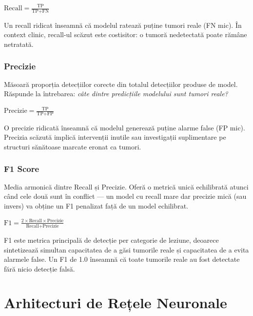 \documentclass[12pt, a4paper]{report}
\newcommand{\formula}[1]{%
    \begin{center}
        \colorbox{codebackground}{%
            \parbox{0.88\textwidth}{\centering\vspace{4pt}$#1$\vspace{4pt}}%
        }
    \end{center}
}
\begin{document}
\formula{
    \text{Recall} = \frac{\text{TP}}{\text{TP} + \text{FN}}
}

Un recall ridicat înseamnă că modelul ratează puține tumori reale (FN mic).
În context clinic, recall-ul scăzut este costisitor: o tumoră nedetectată
poate rămâne netratată.

\subsection{Precizie}
\vspace{4pt}
\begin{infobox}
Măsoară proporția detecțiilor corecte din totalul detecțiilor
produse de model. Răspunde la întrebarea: \textit{câte dintre
predicțiile modelului sunt tumori reale?}
\end{infobox}

\formula{
    \text{Precizie} = \frac{\text{TP}}{\text{TP} + \text{FP}}
}

O precizie ridicată înseamnă că modelul generează puține alarme false (FP mic).
Precizia scăzută implică intervenții inutile sau investigații suplimentare
pe structuri sănătoase marcate eronat ca tumori.

\subsection{F1 Score}
\vspace{4pt}
\begin{infobox}
Media armonică dintre Recall și Precizie. Oferă o metrică unică
echilibrată atunci când cele două sunt în conflict — un model
cu recall mare dar precizie mică (sau invers) va obține un F1
penalizat față de un model echilibrat.
\end{infobox}

\formula{
    \text{F1} = \frac{2 \times \text{Recall} \times \text{Precizie}}{\text{Recall} + \text{Precizie}}
}

F1 este metrica principală de detecție per categorie de leziune,
deoarece sintetizează simultan capacitatea de a găsi tumorile reale
și capacitatea de a evita alarmele false. Un F1 de 1.0 înseamnă
că toate tumorile reale au fost detectate fără nicio detecție falsă.

\newpage

\chapter{Arhitecturi de Rețele Neuronale}
\end{document}
